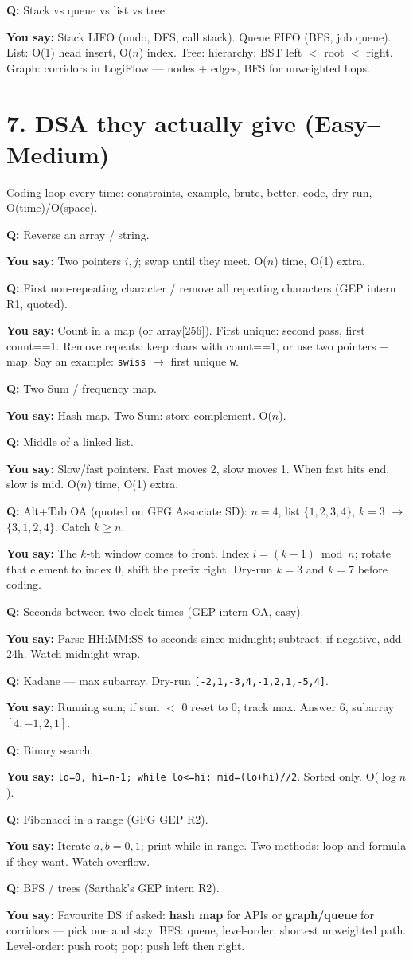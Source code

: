 \documentclass[a4paper,9.5pt]{extarticle}
\newcommand{\Q}[1]{\par\vspace{1.5pt}\noindent\textcolor{hot}{\textbf{Q:} #1}\par}
\newcommand{\Say}[1]{\noindent\textcolor{ok}{\textbf{You say:} #1}\par}
\begin{document}
\Q{Stack vs queue vs list vs tree.}
\Say{Stack LIFO (undo, DFS, call stack). Queue FIFO (BFS, job queue). List: O(1) head insert, O($n$) index. Tree: hierarchy; BST left $<$ root $<$ right. Graph: corridors in LogiFlow --- nodes + edges, BFS for unweighted hops.}

\section{7. DSA they actually give (Easy--Medium)}
Coding loop every time: constraints, example, brute, better, code, dry-run, O(time)/O(space).

\Q{Reverse an array / string.}
\Say{Two pointers $i,j$; swap until they meet. O($n$) time, O(1) extra.}

\Q{First non-repeating character / remove all repeating characters (GEP intern R1, quoted).}
\Say{Count in a map (or array[256]). First unique: second pass, first count==1. Remove repeats: keep chars with count==1, or use two pointers + map. Say an example: \texttt{swiss} $\to$ first unique \texttt{w}.}

\Q{Two Sum / frequency map.}
\Say{Hash map. Two Sum: store complement. O($n$).}

\Q{Middle of a linked list.}
\Say{Slow/fast pointers. Fast moves 2, slow moves 1. When fast hits end, slow is mid. O($n$) time, O(1) extra.}

\Q{Alt+Tab OA (quoted on GFG Associate SD): $n=4$, list $\{1,2,3,4\}$, $k=3$ $\to$ $\{3,1,2,4\}$. Catch $k \ge n$.}
\Say{The $k$-th window comes to front. Index $i=(k-1)\bmod n$; rotate that element to index 0, shift the prefix right. Dry-run $k=3$ and $k=7$ before coding.}

\Q{Seconds between two clock times (GEP intern OA, easy).}
\Say{Parse HH:MM:SS to seconds since midnight; subtract; if negative, add 24h. Watch midnight wrap.}

\Q{Kadane --- max subarray. Dry-run \texttt{[-2,1,-3,4,-1,2,1,-5,4]}.}
\Say{Running sum; if sum $<$ 0 reset to 0; track max. Answer 6, subarray $[4,-1,2,1]$.}

\Q{Binary search.}
\Say{\texttt{lo=0, hi=n-1; while lo<=hi: mid=(lo+hi)//2}. Sorted only. O($\log n$).}

\Q{Fibonacci in a range (GFG GEP R2).}
\Say{Iterate $a,b=0,1$; print while in range. Two methods: loop and formula if they want. Watch overflow.}

\Q{BFS / trees (Sarthak's GEP intern R2).}
\Say{Favourite DS if asked: \textbf{hash map} for APIs or \textbf{graph/queue} for corridors --- pick one and stay. BFS: queue, level-order, shortest unweighted path. Level-order: push root; pop; push left then right.}
\end{document}

